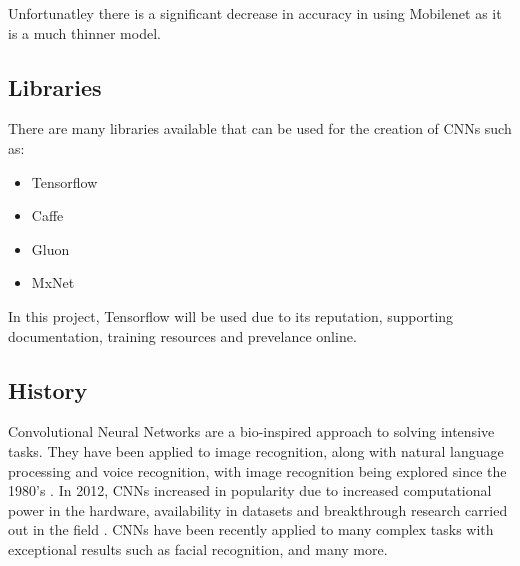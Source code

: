 Unfortunatley there is a significant decrease in accuracy in using Mobilenet as it is a much thinner model.

\subsection*{Libraries}
There are many libraries available that can be used for the creation of CNNs such as:
\begin{itemize}
    \item{Tensorflow}
    \item{Caffe}
    \item{Gluon}
    \item{MxNet}
\end{itemize}
In this project, Tensorflow will be used due to its reputation, supporting documentation, training resources and prevelance online.

\subsection*{History}
Convolutional Neural Networks are a bio-inspired approach to solving intensive tasks.
They have been applied to image recognition, along with natural language processing and voice recognition, with image recognition being explored since the 1980's \parencite{handsOnML}.
In 2012, CNNs increased in popularity due to increased computational power in the hardware, availability in datasets and breakthrough research carried out in the field \parencite{krizhevsky2012imagenet}.
CNNs have been recently applied to many complex tasks with exceptional results such as facial recognition, and many more.